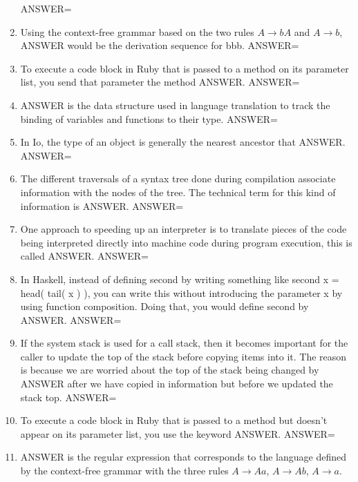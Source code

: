 \documentclass{exam}
\begin{document}
\begin{enumerate}
ANSWER=
\item Using the context-free grammar based on the two rules $A \rightarrow b A$ and $A \rightarrow b$, ANSWER would be the derivation sequence for bbb.\newline
ANSWER=
\item To execute a code block in Ruby that is passed to a method on its parameter list, you send that parameter the method ANSWER.\newline
ANSWER=
\item ANSWER is the data structure used in language translation to track the binding of variables and functions to their type.\newline
ANSWER=
\item In Io, the type of an object is generally the nearest ancestor that ANSWER.\newline
ANSWER=
\item The different traversals of a syntax tree done during compilation associate information with the nodes of the tree.  The technical term for this kind of information is ANSWER.\newline
ANSWER=
\item One approach to speeding up an interpreter is to translate pieces of the code being interpreted directly into machine code during program execution, this is called ANSWER.\newline
ANSWER=
\item In Haskell, instead of defining second by writing something like second x = head( tail(  x ) ), you can write this without introducing the parameter x by using function composition.  Doing that, you would define second by ANSWER.\newline
ANSWER=
\item If the system stack is used for a call stack, then it becomes important for the caller to update the top of the stack before copying items into it.  The reason is because we are worried about the top of the stack being changed by ANSWER after we have copied in information but before we updated the stack top.\newline
ANSWER=
\item To execute a code block in Ruby that is passed to a method but doesn't appear on its parameter list, you use the keyword ANSWER.\newline
ANSWER=
\item ANSWER is the regular expression that corresponds to the language defined by the context-free grammar with the three rules $A \rightarrow A a$, $A \rightarrow A b$, $A \rightarrow a$.\newline

\end{enumerate}
\end{document}
